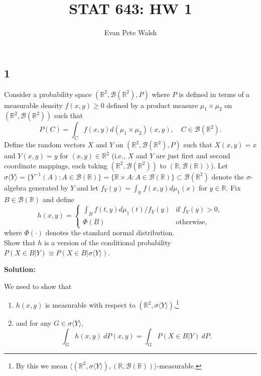 \documentclass[12pt]{article}
\title{STAT 643: HW 1}
\author{Evan Pete Walsh}
\begin{document}

\subsection*{1}
\begin{tcolorbox}
Consider a probability space $(\mathbb{R}^2,\mathcal{B}(\mathbb{R}^2),P)$ where $P$ is defined in terms of a measurable density $f(x,y) \geq 0$ defined by a product measure $\mu_1\times \mu_2$ on $(\mathbb{R}^2,\mathcal{B}(\mathbb{R}^2))$  such that
    \[
      P(C) = \int_C  f(x,y) d(\mu_{1}\times \mu_2)(x,y),\quad C \in \mathcal{B}(\mathbb{R}^2).
    \]
Define the random vectors $X$ and $Y$ on $(\mathbb{R}^2,\mathcal{B}(\mathbb{R}^2),P)$  such that $X(x,y)=x$
 and $Y(x,y)=y$ for $(x,y)\in \mathbb{R}^2$ (i.e., $X$ and $Y$ are just first and second coordinate mappings, each taking $(\mathbb{R}^2,\mathcal{B}(\mathbb{R}^2))$ to $(\mathbb{R},\mathcal{B}(\mathbb{R}))$).  Let $\sigma \langle  Y\rangle =\{ Y^{-1}(A): A \in \mathcal{B}(\mathbb{R}) \} = \{ \mathbb{R}\times A: A\in  \mathcal{B}(\mathbb{R})\} \subset \mathcal{B}(\mathbb{R}^2) $ denote the  $\sigma$-algebra generated by $Y$
 and let $f_Y(y) = \int_{\mathbb{R}} f(x,y) d \mu_1(x)$ for $y\in\mathbb{R}$.  Fix $B\in\mathcal{B}(\mathbb{R})$ and define
 \[
     h(x,y) = \left\{ \begin{array}{cl}
     \int_B f(t,y) d \mu_1(t) /f_Y(y) &\mbox{if $f_Y(y)>0$},\\
     \Phi(B) &\mbox{otherwise},
   \end{array}  \right.
 \]
 where $\Phi(\cdot)$ denotes the standard normal distribution. \\[.1cm]
 Show that $h$ is a version of the conditional probability $P(X\in B|Y)\equiv P( X\in B| \sigma \langle  Y\rangle)$.
\end{tcolorbox}

{\bf Solution:}

We need to show that 
\begin{enumerate}[label=\roman*.]
  \item $h(x,y)$ is measurable with respect to $(\mathbb{R}^{2}, \sigma\langle Y\rangle )$,\footnote{By this we mean $\langle
      (\mathbb{R}^{2}, \sigma \langle Y\rangle), (\mathbb{R}, \mathcal{B}(\mathbb{R}))\rangle$-measurable.} \\
    \item and for any $G \in \sigma\langle Y\rangle$, 
      \begin{equation}
        \int_{G}h(x,y)\ dP(x,y) = \int_{G} P(X\in B | Y)\ dP.
        \label{1.1}
      \end{equation}
\end{enumerate}
\end{document}
